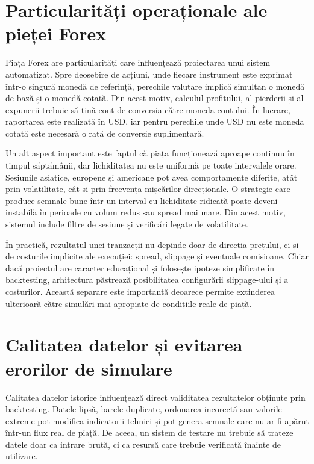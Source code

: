 \section{Particularități operaționale ale pieței Forex}
\label{cap:cap2:particularitati_forex}

Piața Forex are particularități care influențează proiectarea unui sistem automatizat. Spre deosebire de acțiuni, unde fiecare instrument este exprimat într-o singură monedă de referință, perechile valutare implică simultan o monedă de bază și o monedă cotată. Din acest motiv, calculul profitului, al pierderii și al expunerii trebuie să țină cont de conversia către moneda contului. În lucrare, raportarea este realizată în USD, iar pentru perechile unde USD nu este moneda cotată este necesară o rată de conversie suplimentară.

Un alt aspect important este faptul că piața funcționează aproape continuu în timpul săptămânii, dar lichiditatea nu este uniformă pe toate intervalele orare. Sesiunile asiatice, europene și americane pot avea comportamente diferite, atât prin volatilitate, cât și prin frecvența mișcărilor direcționale. O strategie care produce semnale bune într-un interval cu lichiditate ridicată poate deveni instabilă în perioade cu volum redus sau spread mai mare. Din acest motiv, sistemul include filtre de sesiune și verificări legate de volatilitate.

În practică, rezultatul unei tranzacții nu depinde doar de direcția prețului, ci și de costurile implicite ale execuției: spread, slippage și eventuale comisioane. Chiar dacă proiectul are caracter educațional și folosește ipoteze simplificate în backtesting, arhitectura păstrează posibilitatea configurării slippage-ului și a costurilor. Această separare este importantă deoarece permite extinderea ulterioară către simulări mai apropiate de condițiile reale de piață.

\section{Calitatea datelor și evitarea erorilor de simulare}
\label{cap:cap2:calitatea_datelor}

Calitatea datelor istorice influențează direct validitatea rezultatelor obținute prin backtesting. Datele lipsă, barele duplicate, ordonarea incorectă sau valorile extreme pot modifica indicatorii tehnici și pot genera semnale care nu ar fi apărut într-un flux real de piață. De aceea, un sistem de testare nu trebuie să trateze datele doar ca intrare brută, ci ca resursă care trebuie verificată înainte de utilizare.

